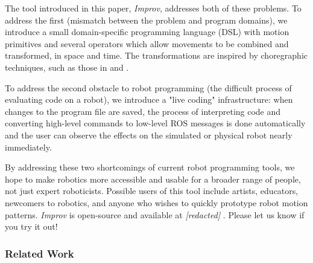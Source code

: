 \documentclass[sigchi-a]{acmart}
\begin{document}
The tool introduced in this paper, \emph{Improv}, addresses both of these
problems. To address the first (mismatch between the problem and
program domains), we introduce a small domain-specific programming language
(DSL) with motion primitives and several operators which allow
movements to be combined and transformed, in space and time. The transformations
are inspired by choregraphic techniques, such as those in
\cite{laviers2017choreographic} \cite{cuykendall2014designing} \cite{alaoui2014choreography} and
\cite{humphrey1959art}.



To address the second obstacle to robot programming (the difficult
process of evaluating code on a robot), we introduce a "live coding"
infrastructure: when changes to the program file are saved, the process of
interpreting code and converting high-level commands to low-level ROS messages
is done automatically and the user can observe the effects on the simulated or
physical robot nearly immediately.

By addressing these two shortcomings of current robot programming tools, we hope
to make robotics more accessible and usable for a broader range of people,
not just expert roboticists. Possible users of this tool include
artists, educators, newcomers to robotics, and anyone who wishes to quickly
prototype robot motion patterns. \emph{Improv} is open-source and available at
\emph{[redacted]}
. Please let us know if you try it
out!

\subsubsection*{Related Work}
\end{document}
